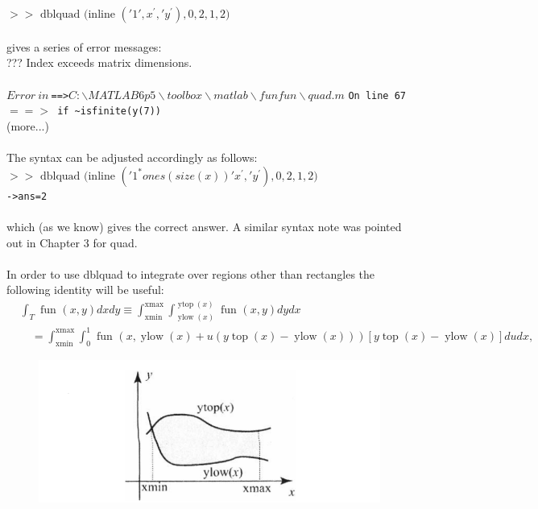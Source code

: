 \documentclass[../main.tex]{subfiles}
\begin{document}
\\
\\
\texttt{$>>\text { dblquad (inline }(' 1 ', x^{\prime}, ' y^{\prime}), 0,2,1,2)$}
\\
\\
gives a series of error messages:
\\
??? Index exceeds matrix dimensions.
\\
\\
\texttt{$Error~ in~ $==>$ C:\backslash MATLAB6p5\backslash toolbox\backslash matlab\backslash funfun\backslash quad.m$}
\texttt{On line 67 $==>$ if \textasciitilde isfinite(y(7))}
\\
(more...)
\\
\\
The syntax can be adjusted accordingly as follows:
\\
\texttt{$>>\text { dblquad (inline }(' 1^{*}ones(size(x))'x^{\prime}, ' y^{\prime}), 0,2,1,2)$
\\
\texttt{->ans=2}
}
\\
\\
which (as we know) gives the correct answer. A similar syntax note was pointed out in Chapter 3 for quad.
\\
\\
In order to use dblquad to integrate over regions other than rectangles the following identity will be useful:
\\
\begin{equation}
\begin{aligned}
&\int_{T} \text { fun }(x, y) d x d y \equiv \int_{\mathrm{xmin}}^{\mathrm{xmax}} \int_{\operatorname{ylow}(x)}^{\operatorname{ytop}(x)} \text { fun }(x, y) d y d x \\
&\quad=\int_{\mathrm{xmin}}^{\mathrm{xmax}} \int_{0}^{1} \text { fun }(x, \operatorname{ylow}(x)+u(y \operatorname{top}(x)-\operatorname{ylow}(x)))[y \operatorname{top}(x)-\operatorname{ylow}(x)] d u d x,
\end{aligned}
\end{equation}
\begin{figure}[H]
\includegraphics[width=0.9\linewidth]{20}
	\centering
	\label{pfig:ch13_17}
\end{figure}
\end{document}
